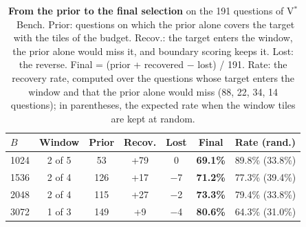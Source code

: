 \begin{table}[t]
  \centering
  \footnotesize
  \setlength{\tabcolsep}{2.5pt}
  \begin{tabular}{lc ccc cc}
    \toprule
    $B$ & Window & Prior & Recov. & Lost & Final & Rate (rand.) \\
    \midrule
    1024 & 2 of 5 & 53 & +79 & 0 & \textbf{69.1\%} & 89.8\% (33.8\%) \\
    1536 & 2 of 4 & 126 & +17 & $-$7 & \textbf{71.2\%} & 77.3\% (39.4\%) \\
    2048 & 2 of 4 & 115 & +27 & $-$2 & \textbf{73.3\%} & 79.4\% (33.8\%) \\
    3072 & 1 of 3 & 149 & +9 & $-$4 & \textbf{80.6\%} & 64.3\% (31.0\%) \\
    \bottomrule
  \end{tabular}
  \caption{\textbf{From the prior to the final selection} on the 191 questions of V$^*$~Bench. Prior: questions on which the prior alone covers the target with the tiles of the budget. Recov.: the target enters the window, the prior alone would miss it, and boundary scoring keeps it. Lost: the reverse. Final = (prior + recovered $-$ lost) / 191. Rate: the recovery rate, computed over the questions whose target enters the window and that the prior alone would miss (88, 22, 34, 14 questions); in parentheses, the expected rate when the window tiles are kept at random.}
  \label{tab:window}
\end{table}
